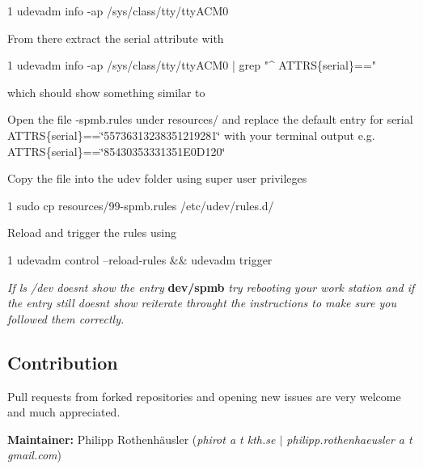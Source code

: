 \begin{DoxyCode}
1 udevadm info -ap /sys/class/tty/ttyACM0
\end{DoxyCode}



\begin{DoxyItemize}
\item From there extract the serial attribute with
\end{DoxyItemize}


\begin{DoxyCode}
1 udevadm info -ap /sys/class/tty/ttyACM0 | grep "^    ATTRS\{serial\}=="
\end{DoxyCode}


which should show something similar to





\begin{DoxyItemize}
\item Open the file {-\/spmb.\+rules} under {\ttfamily resources/} and replace the default entry for serial {\ttfamily A\+T\+T\+RS\{serial\}==\char`\"{}55736313238351219281\char`\"{}} with your terminal output e.\+g. {\ttfamily A\+T\+T\+RS\{serial\}==\char`\"{}85430353331351\+E0\+D120\char`\"{}}
\item Copy the file into the udev folder using super user privileges
\end{DoxyItemize}


\begin{DoxyCode}
1 sudo cp resources/99-spmb.rules /etc/udev/rules.d/
\end{DoxyCode}



\begin{DoxyItemize}
\item Reload and trigger the rules using
\end{DoxyItemize}


\begin{DoxyCode}
1 udevadm control --reload-rules && udevadm trigger
\end{DoxyCode}


{\itshape If {\ttfamily ls /dev} doesn\textquotesingle{}t show the entry} {\bfseries dev/spmb} {\itshape try rebooting your work station and if the entry still doesn\textquotesingle{}t show reiterate throught the instructions to make sure you followed them correctly.}

\subsection*{Contribution}

Pull requests from forked repositories and opening new issues are very welcome and much appreciated.

{\bfseries Maintainer\+:} Philipp Rothenhäusler ({\itshape phirot a t kth.\+se $\vert$ philipp.\+rothenhaeusler a t gmail.\+com}) 